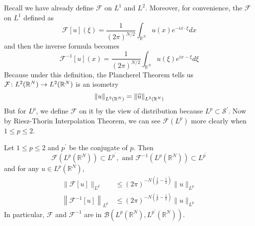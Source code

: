 \noindent Recall we have already define $\mathcal{F}$ on $L^1$ and $L^2$. Moreover, for convenience, the $\mathcal{F}$ on $L^1$ defined as
\begin{equation*}
	\mathcal{F}[u](\xi)=\frac{1}{(2 \pi)^{N / 2}} \int_{\mathbb{R}^N} u(x) e^{-i x \cdot \xi} d x
\end{equation*}
and then the inverse formula becomes
\begin{equation*}
	\mathcal{F}^{-1}[u](x)=\frac{1}{(2 \pi)^{N / 2}} \int_{\mathbb{R}^N} u(\xi) e^{i x-\xi} d \xi
\end{equation*}
Because under this definition, the Plancherel Theorem tells us $\mathcal{F} \colon L^{2}(\mathbb{R}^N) \rightarrow  L^{2}(\mathbb{R}^N)$ is an isometry
\begin{equation*}
 	\left\lVert u\right\lVert_{L^{2}(\mathbb{R}^N)} = \left\lVert\widehat{u}\right\lVert_{L^{2}(\mathbb{R}^N)}
\end{equation*} 
But for $L^p$, we define $\mathcal{F}$ on it by the view of distribution because $L^p \subset \mathcal{S}^\prime$. Now by Riesz-Thorin Interpolation Theorem, we can see $\mathcal{F}(L^p)$ more clearly when $1 \leq p \leq 2$.
\begin{thm}
	Let $1 \leqslant p \leqslant 2$ and $p^{\prime}$ be the conjugate of $p$. Then
	$$
	\mathcal{F}\left(L^p\left(\mathbb{R}^N\right)\right) \subset L^{p^{\prime}}, \text { and } \mathcal{F}^{-1}\left(L^p\left(\mathbb{R}^N\right)\right) \subset L^{p^{\prime}}
	$$
	and for any $u \in L^p\left(\mathbb{R}^N\right)$,
	$$
	\begin{aligned}
	\|\mathcal{F}[u]\|_{L^{p^{\prime}}} & \leqslant(2 \pi)^{-N\left(\frac{1}{p}-\frac{1}{2}\right)}\|u\|_{L^p} \\
	\left\|\mathcal{F}^{-1}[u]\right\|_{L^{p^{\prime}}} & \leqslant(2 \pi)^{-N\left(\frac{1}{p}-\frac{1}{2}\right)}\|u\|_{L^p}
	\end{aligned}
	$$
	In particular, $\mathcal{F}$ and $\mathcal{F}^{-1}$ are in $\mathcal{B}\left(L^p\left(\mathbb{R}^N\right), L^{p^{\prime}}\left(\mathbb{R}^N\right)\right)$.
\end{thm}
